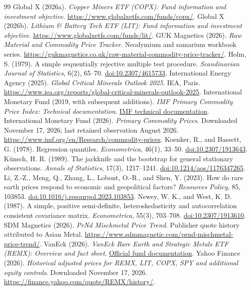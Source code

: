 \begin{thebibliography}{99}
 Global X (2026a). \textit{Copper Miners ETF (COPX): Fund information and investment objective}. \url{https://www.globalxetfs.com/funds/copx/}.
 Global X (2026b). \textit{Lithium \& Battery Tech ETF (LIT): Fund information and investment objective}. \url{https://www.globalxetfs.com/funds/lit/}.
 GUK Magnetics (2026). \textit{Raw Material and Commodity Price Tracker}. Neodymium and samarium workbook series. \url{https://gukmagnetics.co.uk/raw-material-commodity-price-tracker/}.
 Holm, S. (1979). A simple sequentially rejective multiple test procedure. \textit{Scandinavian Journal of Statistics}, 6(2), 65–70. \href{https://doi.org/10.2307/4615733}{doi:10.2307/4615733}.
 International Energy Agency (2025). \textit{Global Critical Minerals Outlook 2025}. IEA, Paris. \url{https://www.iea.org/reports/global-critical-minerals-outlook-2025}.
 International Monetary Fund (2019, with subsequent additions). \textit{IMF Primary Commodity Price Index: Technical documentation}. \href{https://www.imf.org/-/media/files/research/commodityprices/monthly/pcps-technical-documentation.pdf}{IMF technical documentation}.
 International Monetary Fund (2026). \textit{Primary Commodity Prices}. Downloaded November 17, 2026; last retained observation August 2026. \url{https://www.imf.org/en/Research/commodity-prices}.
 Koenker, R., and Bassett, G. (1978). Regression quantiles. \textit{Econometrica}, 46(1), 33–50. \href{https://doi.org/10.2307/1913643}{doi:10.2307/1913643}.
 Künsch, H. R. (1989). The jackknife and the bootstrap for general stationary observations. \textit{Annals of Statistics}, 17(3), 1217–1241. \href{https://doi.org/10.1214/aos/1176347265}{doi:10.1214/aos/1176347265}.
 Li, Z.-Z., Meng, Q., Zhang, L., Lobont, O.-R., and Shen, Y. (2023). How do rare earth prices respond to economic and geopolitical factors? \textit{Resources Policy}, 85, 103853. \href{https://doi.org/10.1016/j.resourpol.2023.103853}{doi:10.1016/j.resourpol.2023.103853}.
 Newey, W. K., and West, K. D. (1987). A simple, positive semi-definite, heteroskedasticity and autocorrelation consistent covariance matrix. \textit{Econometrica}, 55(3), 703–708. \href{https://doi.org/10.2307/1913610}{doi:10.2307/1913610}.
 SDM Magnetics (2026). \textit{PrNd Mischmetal Price Trend}. Publisher quote history attributed to Asian Metal. \url{https://www.sdmmagnetic.com/prnd-mischmetal-price-trend/}.
 VanEck (2026). \textit{VanEck Rare Earth and Strategic Metals ETF (REMX): Overview and fact sheet}. \href{https://www.vaneck.com/us/en/investments/rare-earth-strategic-metals-etf-remx/overview/}{Official fund documentation}.
 Yahoo Finance (2026). \textit{Historical adjusted prices for REMX, LIT, COPX, SPY and additional equity controls}. Downloaded November 17, 2026. \url{https://finance.yahoo.com/quote/REMX/history/}.
\end{thebibliography}
